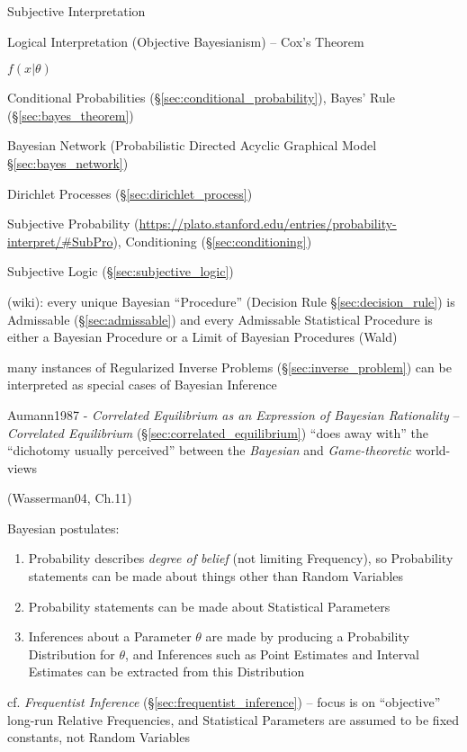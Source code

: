 Subjective Interpretation

Logical Interpretation (Objective Bayesianism) -- Cox's Theorem

$f(x | \theta)$

Conditional Probabilities (\S\ref{sec:conditional_probability}), Bayes' Rule
(\S\ref{sec:bayes_theorem})

\fist Bayesian Network (Probabilistic Directed Acyclic Graphical Model
\S\ref{sec:bayes_network})

\fist Dirichlet Processes (\S\ref{sec:dirichlet_process})

Subjective Probability %
(\url{https://plato.stanford.edu/entries/probability-interpret/#SubPro}),
Conditioning (\S\ref{sec:conditioning})

\fist Subjective Logic (\S\ref{sec:subjective_logic})

(wiki): every unique Bayesian ``Procedure'' (Decision Rule
\S\ref{sec:decision_rule}) is Admissable (\S\ref{sec:admissable}) and every
Admissable Statistical Procedure is either a Bayesian Procedure or a Limit of
Bayesian Procedures (Wald)

many instances of Regularized Inverse Problems (\S\ref{sec:inverse_problem}) can
be interpreted as special cases of Bayesian Inference

\fist Aumann1987 - \emph{Correlated Equilibrium as an Expression of Bayesian
  Rationality} -- \emph{Correlated Equilibrium}
(\S\ref{sec:correlated_equilibrium}) ``does away with'' the ``dichotomy usually
perceived'' between the \emph{Bayesian} and \emph{Game-theoretic} world-views

(Wasserman04, Ch.11)

Bayesian postulates:
\begin{enumerate}
  \item Probability describes \emph{degree of belief} (not limiting Frequency),
    so Probability statements can be made about things other than Random
    Variables
  \item Probability statements can be made about Statistical Parameters
  \item Inferences about a Parameter $\theta$ are made by producing a
    Probability Distribution for $\theta$, and Inferences such as Point
    Estimates and Interval Estimates can be extracted from this Distribution
\end{enumerate}

cf. \emph{Frequentist Inference} (\S\ref{sec:frequentist_inference}) -- focus is
on ``objective'' long-run Relative Frequencies, and Statistical Parameters are
assumed to be fixed constants, not Random Variables

